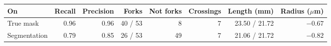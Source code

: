 \begin{tabular}{lrrrrrrr}
\toprule
On & Recall & Precision & Forks & Not forks & Crossings & Length (mm) & Radius ($\mu$m) \\
\midrule
True mask & 0.96 & 0.96 & 40 / 53 & 8 & 7 & 23.50 / 21.72 & $-0.67$ \\
Segmentation & 0.79 & 0.85 & 26 / 53 & 49 & 7 & 21.06 / 21.72 & $-0.82$ \\
\bottomrule
\end{tabular}
